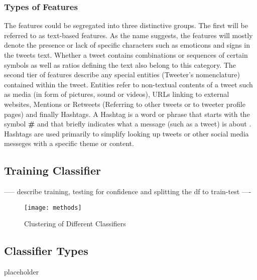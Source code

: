 		\subsubsection*{Types of Features}
		The features could be segregated into three distinctive groups. The first will be referred to as text-based features. As the name suggests, the features will mostly denote the presence or lack of specific characters such as emoticons and signs in the tweets text. Whether a tweet contains combinations or sequences of certain symbols as well as ratios defining the text also belong to this category.
		The second tier of features describe any special entities (Tweeter's nomenclature) contained within the tweet. Entities refer to non-textual contents of a tweet such as media (in form of pictures, sound or videos), URLs linking to external websites, Mentions or Retweets (Referring to other tweets or to tweeter profile pages) and finally Hashtags. A Hashtag is a word or phrase that starts with the symbol \textbf{\#} and that briefly indicates what a message (such as a tweet) is about \cite{dict_tweet}. Hashtags are used primarily to simplify looking up tweets or other social media messeges with a specific theme or content.
		
	\subsection{Training Classifier}	
	{\Large \color{red} ----- describe training, testing for confidence and splitting the df to train-test ----}
	\begin{figure}[h]
		
		\centering
		\texttt{[image: methods]}
		\caption{Clustering of Different Classifiers}
	\end{figure}

	\subsection{Classifier Types}
		{\color{red} \Large placeholder}
	
	
	
		
		
		
		